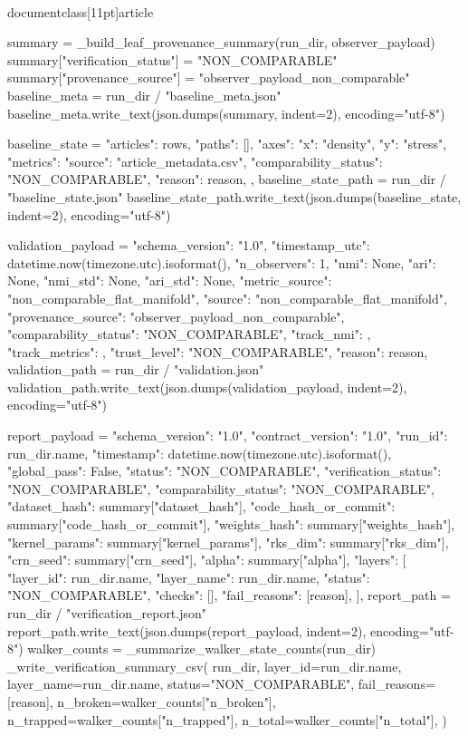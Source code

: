 \\documentclass[11pt]{article}
\begin{document}
\begin{CodeBlock}
    summary = _build_leaf_provenance_summary(run_dir, observer_payload)
    summary["verification_status"] = "NON_COMPARABLE"
    summary["provenance_source"] = "observer_payload_non_comparable"
    baseline_meta = run_dir / "baseline_meta.json"
    baseline_meta.write_text(json.dumps(summary, indent=2), encoding="utf-8")

    baseline_state = {
        "articles": rows,
        "paths": [],
        "axes": {"x": "density", "y": "stress"},
        "metrics": {
            "source": "article_metadata.csv",
            "comparability_status": "NON_COMPARABLE",
            "reason": reason,
        },
    }
    baseline_state_path = run_dir / "baseline_state.json"
    baseline_state_path.write_text(json.dumps(baseline_state, indent=2), encoding="utf-8")

    validation_payload = {
        "schema_version": "1.0",
        "timestamp_utc": datetime.now(timezone.utc).isoformat(),
        "n_observers": 1,
        "nmi": None,
        "ari": None,
        "nmi_std": None,
        "ari_std": None,
        "metric_source": "non_comparable_flat_manifold",
        "source": "non_comparable_flat_manifold",
        "provenance_source": "observer_payload_non_comparable",
        "comparability_status": "NON_COMPARABLE",
        "track_nmi": {},
        "track_metrics": {},
        "trust_level": "NON_COMPARABLE",
        "reason": reason,
    }
    validation_path = run_dir / "validation.json"
    validation_path.write_text(json.dumps(validation_payload, indent=2), encoding="utf-8")

    report_payload = {
        "schema_version": "1.0",
        "contract_version": "1.0",
        "run_id": run_dir.name,
        "timestamp": datetime.now(timezone.utc).isoformat(),
        "global_pass": False,
        "status": "NON_COMPARABLE",
        "verification_status": "NON_COMPARABLE",
        "comparability_status": "NON_COMPARABLE",
        "dataset_hash": summary["dataset_hash"],
        "code_hash_or_commit": summary["code_hash_or_commit"],
        "weights_hash": summary["weights_hash"],
        "kernel_params": summary["kernel_params"],
        "rks_dim": summary["rks_dim"],
        "crn_seed": summary["crn_seed"],
        "alpha": summary["alpha"],
        "layers": [
            {
                "layer_id": run_dir.name,
                "layer_name": run_dir.name,
                "status": "NON_COMPARABLE",
                "checks": [],
                "fail_reasons": [reason],
            }
        ],
    }
    report_path = run_dir / "verification_report.json"
    report_path.write_text(json.dumps(report_payload, indent=2), encoding="utf-8")
    walker_counts = _summarize_walker_state_counts(run_dir)
    _write_verification_summary_csv(
        run_dir,
        layer_id=run_dir.name,
        layer_name=run_dir.name,
        status="NON_COMPARABLE",
        fail_reasons=[reason],
        n_broken=walker_counts["n_broken"],
        n_trapped=walker_counts["n_trapped"],
        n_total=walker_counts["n_total"],
    )


\end{CodeBlock}
\end{document}
